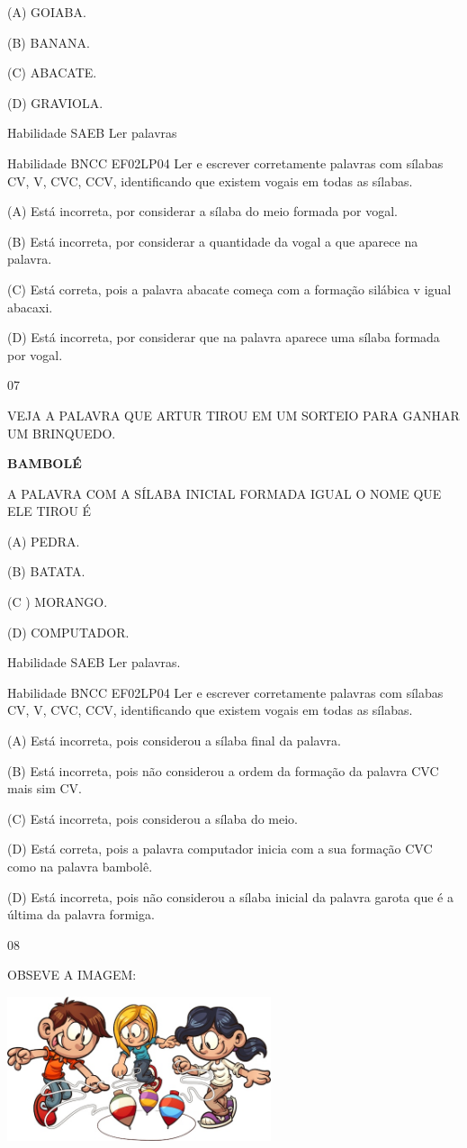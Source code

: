 {{{{{{(A) GOIABA.

(B) BANANA.

(C) ABACATE.

(D) GRAVIOLA.

Habilidade SAEB Ler palavras

Habilidade BNCC EF02LP04 Ler e escrever corretamente palavras com
sílabas CV, V, CVC, CCV, identificando que existem vogais em todas as
sílabas.

(A) Está incorreta, por considerar a sílaba do meio formada por vogal.

(B) Está incorreta, por considerar a quantidade da vogal a que aparece
na palavra.

(C) Está correta, pois a palavra abacate começa com a formação silábica
v igual abacaxi.

(D) Está incorreta, por considerar que na palavra aparece uma sílaba
formada por vogal.

\num{07}

VEJA A PALAVRA QUE ARTUR TIROU EM UM SORTEIO PARA GANHAR UM BRINQUEDO.

\textbf{BAMBOLÉ}

A PALAVRA COM A SÍLABA INICIAL FORMADA IGUAL O NOME QUE ELE TIROU É

(A) PEDRA.

(B) BATATA.

(C ) MORANGO.

(D) COMPUTADOR.

\protect\hypertarget{_Hlk129508691}{}{}Habilidade SAEB Ler palavras.

Habilidade BNCC EF02LP04 Ler e escrever corretamente palavras com
sílabas CV, V, CVC, CCV, identificando que existem vogais em todas as
sílabas.

(A) Está incorreta, pois considerou a sílaba final da palavra.

(B) Está incorreta, pois não considerou a ordem da formação da palavra
CVC mais sim CV.

(C) Está incorreta, pois considerou a sílaba do meio.

(D) Está correta, pois a palavra computador inicia com a sua formação
CVC como na palavra bambolê.

(D) Está incorreta, pois não considerou a sílaba inicial da palavra
garota que é a última da palavra formiga.

\num{08}

OBSEVE A IMAGEM:

\includegraphics[width=3.05095in,height=1.66841in]{media/image144.jpeg}

}}}}}}
